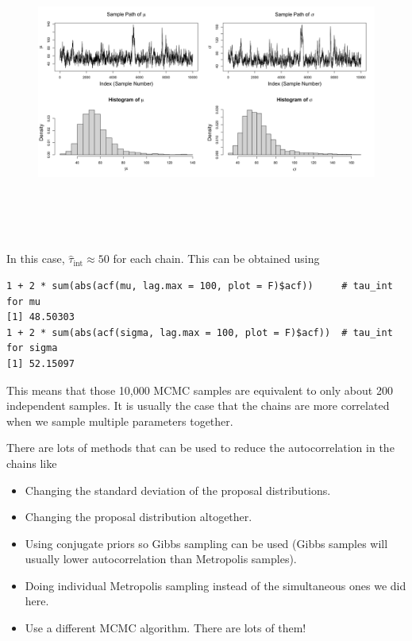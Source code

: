 \documentclass[11pt]{article}
\begin{document}
\newpage
\begin{figure}[H]
\centering
\includegraphics[width=6in,height=3.8in]{bayes_figs/Plots_mu_sigma.png} 
\end{figure}

In this case, $\hat{\tau}_{\text{int}}\approx50$ for each chain. This can be obtained using
\begin{verbatim}
1 + 2 * sum(abs(acf(mu, lag.max = 100, plot = F)$acf))     # tau_int for mu
[1] 48.50303
1 + 2 * sum(abs(acf(sigma, lag.max = 100, plot = F)$acf))  # tau_int for sigma
[1] 52.15097
\end{verbatim}
This means that those 10,000 MCMC samples are equivalent to only about 200 independent samples. It is usually the case that the chains are more correlated when we sample multiple parameters together.

There are lots of methods that can be used to reduce the autocorrelation in the chains like
\begin{itemize}
\item Changing the standard deviation of the proposal distributions.
\item Changing the proposal distribution altogether.
\item Using conjugate priors so Gibbs sampling can be used (Gibbs samples will usually lower autocorrelation than Metropolis samples).
\item Doing individual Metropolis sampling instead of the simultaneous ones we did here.
\item Use a different MCMC algorithm. There are lots of them!\\
\end{itemize}
\end{document}
